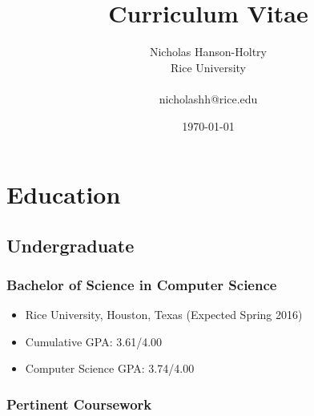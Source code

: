 \documentclass[a4paper]{article}
\begin{document}
\begin{titlepage}

\title{Curriculum Vitae}
\author{Nicholas Hanson-Holtry
\\ Rice University
\\
\\ \normalsize{nicholashh@rice.edu}}
\date{\normalsize{\today}}
\maketitle

\vfill

\setcounter{tocdepth}{2}
\tableofcontents

\vfill

\thispagestyle{empty}

\end{titlepage}





\section{Education}

\subsection{Undergraduate}

\subsubsection{Bachelor of Science in Computer Science}

\begin{itemize}

    \item{Rice University, Houston, Texas (Expected Spring 2016)}

    \item{Cumulative GPA: 3.61/4.00}

    \item{Computer Science GPA: 3.74/4.00}

\end{itemize}





\subsubsection{Pertinent Coursework}
\end{document}
